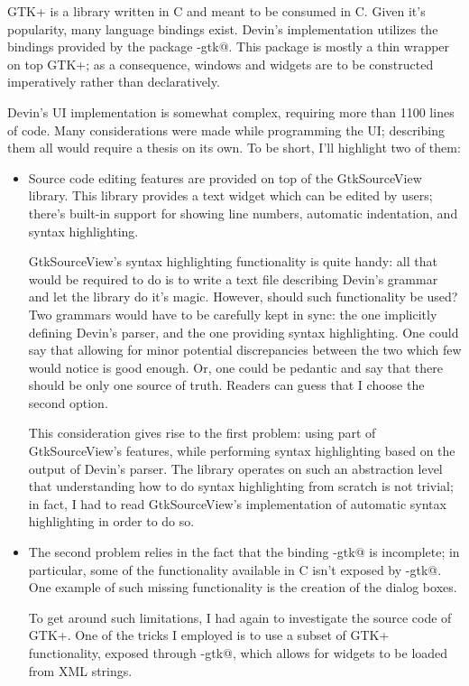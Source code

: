 \documentclass[UdineBachThesis,american,11pt,draft]{PhdThesis}
\begin{document}
  GTK+ is a library written in C and meant to be consumed in C. Given it's
  popularity, many language bindings exist. Devin's implementation utilizes the
  bindings provided by the package \lstinline@gi-gtk@. This package is mostly a
  thin wrapper on top GTK+; as a consequence, windows and widgets are to be
  constructed imperatively rather than declaratively.

  Devin's UI implementation is somewhat complex, requiring more than 1100 lines
  of code. Many considerations were made while programming the UI; describing
  them all would require a thesis on its own. To be short, I'll highlight two
  of them:

  \begin{itemize}
    \item Source code editing features are provided on top of the GtkSourceView
    library. This library provides a text widget which can be edited by users;
    there's built-in support for showing line numbers, automatic indentation,
    and syntax highlighting.

    GtkSourceView's syntax highlighting functionality is quite handy: all that
    would be required to do is to write a text file describing Devin's grammar
    and let the library do it's magic. However, should such functionality be
    used? Two grammars would have to be carefully kept in sync: the one
    implicitly defining Devin's parser, and the one providing syntax
    highlighting. One could say that allowing for minor potential discrepancies
    between the two which few would notice is good enough. Or, one could be
    pedantic and say that there should be only one source of truth. Readers can
    guess that I choose the second option.

    This consideration gives rise to the first problem: using part of
    GtkSourceView's features, while performing syntax highlighting based on the
    output of Devin's parser. The library operates on such an abstraction level
    that understanding how to do syntax highlighting from scratch is not
    trivial; in fact, I had to read GtkSourceView's implementation of automatic
    syntax highlighting in order to do so.

    \item The second problem relies in the fact that the binding
    \lstinline@gi-gtk@ is incomplete; in particular, some of the functionality
    available in C isn't exposed by \lstinline@gi-gtk@. One example of such
    missing functionality is the creation of the dialog boxes.

    To get around such limitations, I had again to investigate the source code
    of GTK+. One of the tricks I employed is to use a subset of GTK+
    functionality, exposed through \lstinline@gi-gtk@, which allows for widgets
    to be loaded from XML strings.
  \end{itemize}
\end{document}

